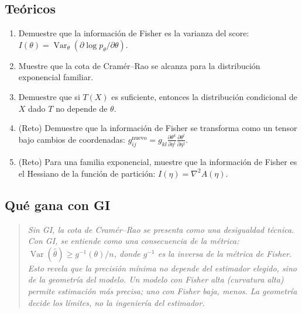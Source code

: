 \subsection*{Teóricos}
\begin{enumerate}[resume]
	\item[$\star\star\star$] Demuestre que la información de Fisher es la varianza del score: $I(\theta) = \operatorname{Var}_\theta(\partial \log p_\theta / \partial \theta)$.
	\item[$\star\star\star$] Muestre que la cota de Cramér--Rao se alcanza para la distribución exponencial familiar.
	\item[$\star\star\star$] Demuestre que si $T(X)$ es suficiente, entonces la distribución condicional de $X$ dado $T$ no depende de $\theta$.
	\item[$\star\star\star\star$] (Reto) Demuestre que la información de Fisher se transforma como un tensor bajo cambios de coordenadas: $g_{ij}^{\text{nuevo}} = g_{kl} \frac{\partial\theta^k}{\partial\eta^i}\frac{\partial\theta^l}{\partial\eta^j}$.
	\item[$\star\star\star\star$] (Reto) Para una familia exponencial, muestre que la información de Fisher es el Hessiano de la función de partición: $I(\eta) = \nabla^2 A(\eta)$.
\end{enumerate}

\subsection*{Qué gana con GI}
\begin{quote}
	\itshape
	Sin GI, la cota de Cramér--Rao se presenta como una desigualdad técnica.  Con GI, se entiende como una consecuencia de la métrica: $\operatorname{Var}(\hat\theta) \ge g^{-1}(\theta)/n$, donde $g^{-1}$ es la inversa de la métrica de Fisher.  Esto revela que la precisión mínima no depende del estimador elegido, sino de la \emph{geometría} del modelo.  Un modelo con Fisher alta (curvatura alta) permite estimación más precisa; uno con Fisher baja, menos.  La geometría decide los límites, no la ingeniería del estimador.
\end{quote}
